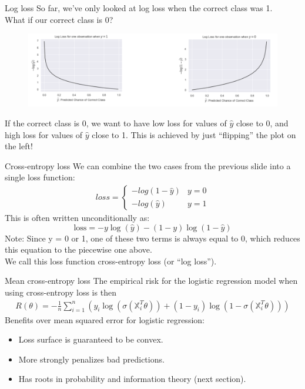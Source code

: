 \documentclass[aspectratio=169]{../latex_main/tntbeamer}  %
\begin{document}
	\begin{frame}{Log loss}
	    So far, we’ve only looked at log loss when the correct class was 1. \\
	    What if our correct class is 0?
        \begin{figure}
            \centering
            \includegraphics[scale=.33]{Bild20}
        \end{figure}
	    If the correct class is 0, we want to have low loss for values of   $\hat{y}$   close to 0, and high loss for values of   $\hat{y}$    close to 1. This is achieved by just “flipping” the plot on the left!
	\end{frame}
	
	
	\begin{frame}{Cross-entropy loss}
	    We can combine the two cases from the previous slide into a single loss function:
	    \begin{align*}
	        loss = \left\{\begin{array}{cc}
	            -log(1 - \hat{y}) & y = 0  \\
	            -log(\hat{y}) & y= 1 
	        \end{array}\right.
	    \end{align*}
	    This is often written unconditionally as:
	    \begin{equation*}
	        \text{loss} = -y\log (\hat{y}) - (1 - y) \log (1 - \hat{y})
	    \end{equation*}
	    Note: Since y = 0 or 1, one of these two terms is always equal to 0, which reduces this equation to the piecewise one above.\\
	    \bigskip
	    We call this loss function cross-entropy loss (or “log loss”).
	\end{frame}
	
	\begin{frame}{Mean cross-entropy loss}
	    The empirical risk for the logistic regression model when using cross-entropy loss is then
	    \begin{align*}
	        R(\theta) = -\frac{1}{n}\sum\limits_{i=1}^n(y_i\log (\sigma (\mathbb{X}_i^T\theta)) + (1 - y_i)\log (1 - \sigma (\mathbb{X}_i^T\theta)))
	    \end{align*}
	    Benefits over mean squared error for logistic regression:
	    \begin{itemize}
	        \item Loss surface is guaranteed to be convex.
	        \item More strongly penalizes bad predictions.
	        \item Has roots in probability and information theory (next section).
	    \end{itemize}
	\end{frame}
	
\end{document}
